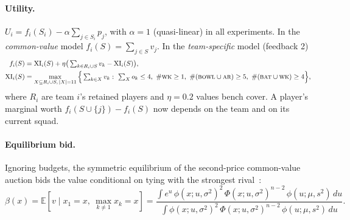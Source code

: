 \documentclass{article}
\newcommand{\E}{\mathbb{E}}
\newcommand{\1}{\mathbb{1}}
\begin{document}
\paragraph{Utility.} $U_i=f_i(S_i)-\alpha\sum_{j\in S_i}p_j$, with $\alpha=1$ (quasi-linear) in all experiments. In the \emph{common-value} model $f_i(S)=\sum_{j\in S}v_j$. In the \emph{team-specific} model (feedback 2)
\begin{equation}
\begin{aligned}
 f_i(S)&=\mathrm{XI}_i(S)+\eta\big(\textstyle\sum_{k\in R_i\cup S}v_k-\mathrm{XI}_i(S)\big),\\
 \mathrm{XI}_i(S)&=\max_{X\subseteq R_i\cup S,\,|X|=11}\Big\{\textstyle\sum_{k\in X}v_k:\ \sum_X o_k\le4,\ \#\textsc{wk}\ge1,\ \#(\textsc{bowl}\cup\textsc{ar})\ge5,\ \#(\textsc{bat}\cup\textsc{wk})\ge4\Big\},
\end{aligned}\label{eq:xi}
\end{equation}
where $R_i$ are team $i$'s retained players and $\eta=0.2$ values bench cover. A player's marginal worth $f_i(S\cup\{j\})-f_i(S)$ now depends on the team and on its current squad.

\paragraph{Equilibrium bid.} Ignoring budgets, the symmetric equilibrium of the second-price common-value auction bids the value conditional on tying with the strongest rival~\citep{milgrom1982,krishna2009}:
\begin{equation}
 \beta(x)=\E[v\mid x_1=x,\ \max_{k\ne1}x_k=x]=\frac{\int e^u\,\phi(x;u,\sigma^2)^2\,\Phi(x;u,\sigma^2)^{n-2}\,\phi(u;\mu,s^2)\,du}{\int \phi(x;u,\sigma^2)^2\,\Phi(x;u,\sigma^2)^{n-2}\,\phi(u;\mu,s^2)\,du}.\label{eq:beta}
\end{equation}
\end{document}
